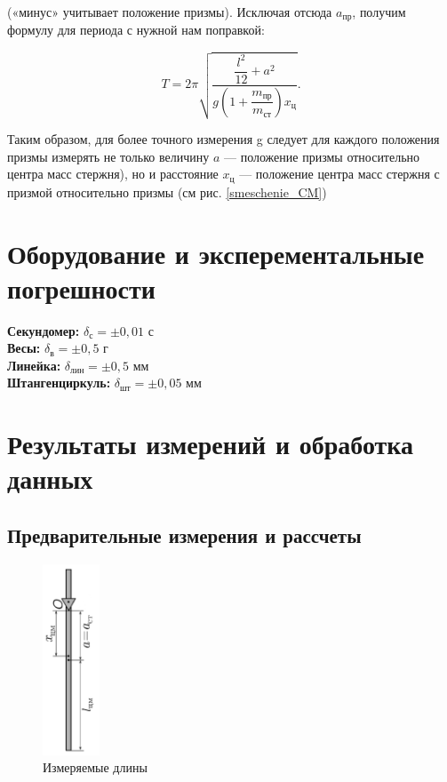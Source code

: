 \documentclass[a4paper,12pt]{article}
\begin{document}
(«минус» учитывает положение призмы). Исключая отсюда $a_{\text{пр}}$, получим
формулу для периода с нужной нам поправкой:

\begin{equation}\label{period_kolebaniy_mayatnika_14}
T = 2\pi \sqrt{ \dfrac{ \dfrac{l^2}{12} + a^2 }{ g (1 + \dfrac{m_{\text{пр}}}{m_{\text{ст}}}) x_{\text{ц}} } }.
\end{equation}


Таким образом, для более точного измерения g следует для каждого положения призмы измерять не только величину $a$ — положение призмы относительно центра масс стержня), но и расстояние $x_{\text{ц}}$ — положение центра масс стержня с призмой относительно призмы (см рис. \ref{smeschenie_CM})


\section{Оборудование и эксперементальные погрешности}

\noindent \textbf{Секундомер:} $\delta_\text{с} = \pm 0,01$ с \\
\textbf{Весы:} $\delta_\text{в} = \pm 0,5$ г \\
\textbf{Линейка:} $\delta_\text{лин} = \pm 0,5$ мм \\
\textbf{Штангенциркуль:} $\delta_\text{шт} = \pm 0,05$ мм \\

\newpage


\section{Результаты измерений и обработка данных}

\subsection{Предварительные измерения и рассчеты}

\begin{figure}
\includegraphics[width=0.15\textwidth]{izmereniya_1.png}
\caption{Измеряемые длины} \label{izmereniya_1}
\end{figure}
\end{document}
